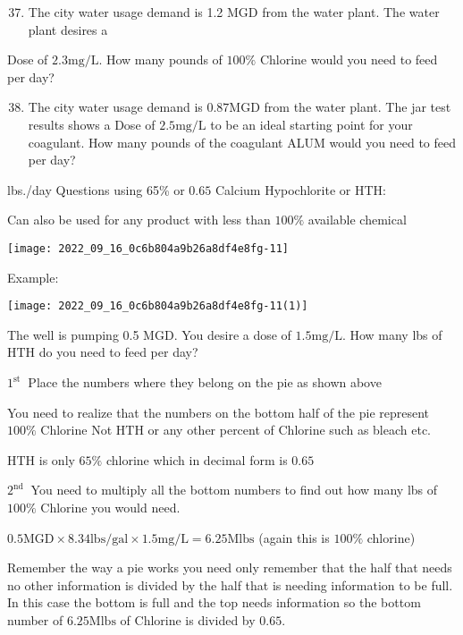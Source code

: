 \begin{enumerate}
\begin{enumerate}
  \setcounter{enumi}{36}
  \item The city water usage demand is 1.2 MGD from the water plant. The water plant desires a
\end{enumerate}
Dose of $2.3 \mathrm{mg} / \mathrm{L}$. How many pounds of $100 \%$ Chlorine would you need to feed per day?

\begin{enumerate}
  \setcounter{enumi}{37}
  \item The city water usage demand is $0.87 \mathrm{MGD}$ from the water plant. The jar test results shows a Dose of $2.5 \mathrm{mg} / \mathrm{L}$ to be an ideal starting point for your coagulant. How many pounds of the coagulant ALUM would you need to feed per day?
\end{enumerate}
lbs./day Questions using 65\% or $0.65$ Calcium Hypochlorite or HTH:

Can also be used for any product with less than $100 \%$ available chemical

\texttt{[image: 2022\_09\_16\_0c6b804a9b26a8df4e8fg-11]}

Example:

\texttt{[image: 2022\_09\_16\_0c6b804a9b26a8df4e8fg-11(1)]}

The well is pumping 0.5 MGD. You desire a dose of $1.5 \mathrm{mg} / \mathrm{L}$. How many lbs of $\mathrm{HTH}$ do you need to feed per day?

$1^{\text {st }}$ Place the numbers where they belong on the pie as shown above

You need to realize that the numbers on the bottom half of the pie represent $100 \%$ Chlorine Not $\mathrm{HTH}$ or any other percent of Chlorine such as bleach etc.

$\mathrm{HTH}$ is only $65 \%$ chlorine which in decimal form is $0.65$

$2^{\text {nd }}$ You need to multiply all the bottom numbers to find out how many lbs of $100 \%$ Chlorine you would need.

$0.5 \mathrm{MGD} \times 8.34 \mathrm{lbs} / \mathrm{gal} \times 1.5 \mathrm{mg} / \mathrm{L}=6.25 \mathrm{Mlbs}$ (again this is $100 \%$ chlorine)

Remember the way a pie works you need only remember that the half that needs no other information is divided by the half that is needing information to be full. In this case the bottom is full and the top needs information so the bottom number of $6.25 \mathrm{Mlbs}$ of Chlorine is divided by $0.65$.


\end{enumerate}
